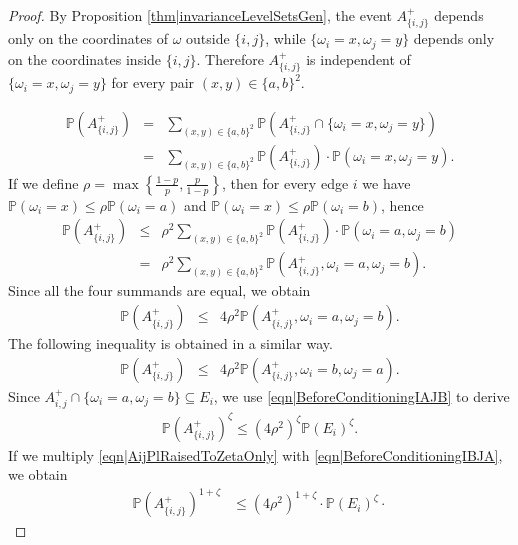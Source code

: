 \documentclass[reqno]{amsart}
\begin{document}
\begin{proof} By Proposition \ref{thm|invarianceLevelSetsGen}, the event $A_{\{i,j\}}^+$ depends only on the coordinates of $\omega$ outside $\{i,j\}$, while $\{\omega_i=x,\omega_j=y\}$ depends only on the coordinates inside $\{i,j\}$. Therefore $A_{\{i,j\}}^+$ is independent of $\{\omega_i=x,\omega_j=y\}$ for every pair $(x,y)\in\{a,b\}^2$.


\begin{eqnarray*}
\mathbb P\left(A_{\{i,j\}}^+\right)&=&\sum_{(x,y)\in\{a,b\}^2} \mathbb P\left(A_{\{i,j\}}^+\cap \{\omega_i=x,\omega_j=y\}\right) \\ &=&
\sum_{(x,y)\in\{a,b\}^2} \mathbb P\left(A_{\{i,j\}}^+\right)\cdot \mathbb P\left(\omega_i=x,\omega_j=y\right).\end{eqnarray*}
If we define $\rho=\max\left\{\frac{1-p}p,\frac{p}{1-p}\right\}$, then for every edge $i$ we have $\mathbb P(\omega_i=x)\leq \rho\mathbb P(\omega_i=a)$ and 
$\mathbb P(\omega_i=x)\leq \rho\mathbb P(\omega_i=b)$, hence
\begin{eqnarray*}
\mathbb P\left(A_{\{i,j\}}^+\right)
&\leq& \rho^2\sum_{(x,y)\in\{a,b\}^2} \mathbb P\left(A_{\{i,j\}}^+\right)\cdot \mathbb P\left(\omega_i=a,\omega_j=b\right) \\ &=& 
\rho^2\sum_{(x,y)\in\{a,b\}^2} \mathbb P\left(A_{\{i,j\}}^+,\omega_i=a,\omega_j=b\right).
\end{eqnarray*} 
Since all the four summands are equal, we obtain
\begin{eqnarray}
\mathbb P\left(A_{\{i,j\}}^+\right)
 &\leq&4 \rho^2 \mathbb P\left(A_{\{i,j\}}^+,\omega_i=a,\omega_j=b\right). \label{eqn|BeforeConditioningIAJB}
 \end{eqnarray}
The following inequality is obtained in a similar way.
 \begin{eqnarray}
\mathbb P\left(A_{\{i,j\}}^+\right)
 &\leq&4 \rho^2 \mathbb P\left(A_{\{i,j\}}^+,\omega_i=b,\omega_j=a\right). \label{eqn|BeforeConditioningIBJA}
 \end{eqnarray}
Since $A_{i,j}^+\cap \{\omega_i=a,\omega_j=b\}\subseteq E_i$, we use \eqref{eqn|BeforeConditioningIAJB} to derive
\begin{eqnarray} \mathbb P\left(A_{\{i,j\}}^+\right)^{\zeta}\leq  (4\rho^2)^{\zeta}\mathbb P(E_i)^{\zeta}. \label{eqn|AijPlRaisedToZetaOnly} \end{eqnarray} If we multiply \eqref{eqn|AijPlRaisedToZetaOnly} with \eqref{eqn|BeforeConditioningIBJA}, we obtain 
\begin{align}\nonumber
\mathbb P\left(A_{\{i,j\}}^+\right)^{1+\zeta}&\leq (4\rho^2)^{1+\zeta}\cdot \mathbb P(E_i)^{\zeta} \cdot 

\end{align}
\end{proof}
\end{document}
